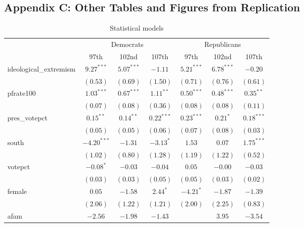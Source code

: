 \documentclass[12pt]{article}
\begin{document}
\subsection{Appendix C: Other Tables and Figures from Replication}
\begin{table}
	\begin{center}
		\caption{Statistical models}
		\begin{tabular}{l c c c c c c }
			\hline
			& \multicolumn{3}{c}{Democrats} & \multicolumn{3}{c}{Republicans} \\
			\cline{2-7}
			& 97th & 102nd & 107th & 97th & 102nd & 107th \\
			\hline
			ideological\_extremism & $9.27^{***}$  & $5.07^{***}$  & $-1.11$      & $5.21^{***}$ & $6.78^{***}$  & $-0.20$       \\
			& $(0.53)$      & $(0.69)$      & $(1.50)$     & $(0.71)$     & $(0.76)$      & $(0.61)$      \\
			pfrate100              & $1.03^{***}$  & $0.67^{***}$  & $1.11^{**}$  & $0.50^{***}$ & $0.48^{***}$  & $0.35^{**}$   \\
			& $(0.07)$      & $(0.08)$      & $(0.36)$     & $(0.08)$     & $(0.08)$      & $(0.11)$      \\
			pres\_votepct          & $0.15^{**}$   & $0.14^{**}$   & $0.22^{***}$ & $0.23^{***}$ & $0.21^{*}$    & $0.18^{***}$  \\
			& $(0.05)$      & $(0.05)$      & $(0.06)$     & $(0.07)$     & $(0.08)$      & $(0.03)$      \\
			south                  & $-4.20^{***}$ & $-1.31$       & $-3.13^{*}$  & $1.53$       & $0.07$        & $1.75^{***}$  \\
			& $(1.02)$      & $(0.80)$      & $(1.28)$     & $(1.19)$     & $(1.22)$      & $(0.52)$      \\
			votepct                & $-0.08^{*}$   & $-0.03$       & $-0.04$      & $0.05$       & $-0.00$       & $-0.03$       \\
			& $(0.03)$      & $(0.03)$      & $(0.05)$     & $(0.05)$     & $(0.03)$      & $(0.02)$      \\
			female                 & $0.05$        & $-1.58$       & $2.44^{*}$   & $-4.21^{*}$  & $-1.87$       & $-1.39$       \\
			& $(2.06)$      & $(1.22)$      & $(1.21)$     & $(2.00)$     & $(2.25)$      & $(0.83)$      \\
			afam                   & $-2.56$       & $-1.98$       & $-1.43$      &              & $3.95$        & $-3.54$       \\

\end{tabular}
\end{center}
\end{table}
\end{document}
